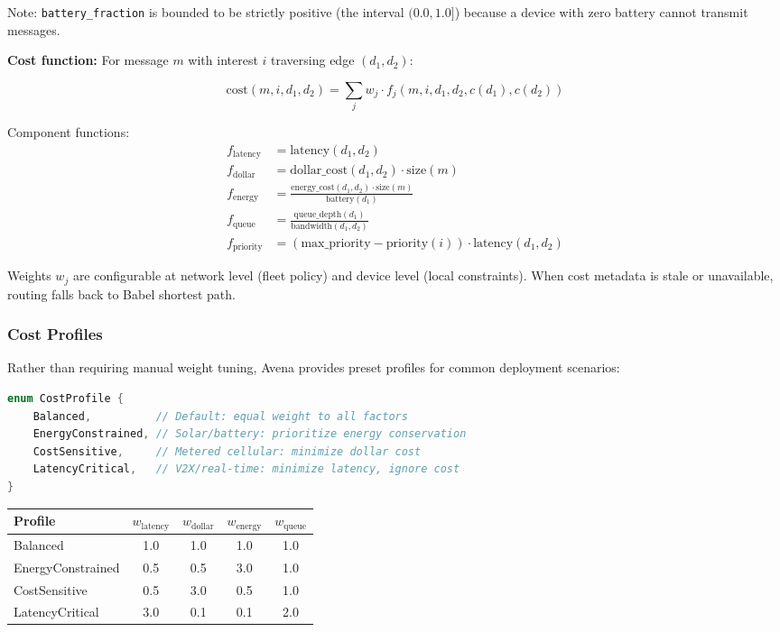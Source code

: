 Note: \texttt{battery\_fraction} is bounded to be strictly positive (the interval $(0.0, 1.0]$) because a device with zero battery cannot transmit messages.

\textbf{Cost function:} For message $m$ with interest $i$ traversing edge $(d_1, d_2)$:

\begin{equation}
\text{cost}(m, i, d_1, d_2) = \sum_j w_j \cdot f_j(m, i, d_1, d_2, c(d_1), c(d_2))
\end{equation}

Component functions:
\begin{align}
f_{\text{latency}} &= \text{latency}(d_1, d_2) \\
f_{\text{dollar}} &= \text{dollar\_cost}(d_1, d_2) \cdot \text{size}(m) \\
f_{\text{energy}} &= \frac{\text{energy\_cost}(d_1, d_2) \cdot \text{size}(m)}{\text{battery}(d_1)} \\
f_{\text{queue}} &= \frac{\text{queue\_depth}(d_1)}{\text{bandwidth}(d_1, d_2)} \\
f_{\text{priority}} &= (\text{max\_priority} - \text{priority}(i)) \cdot \text{latency}(d_1, d_2)
\end{align}

Weights $w_j$ are configurable at network level (fleet policy) and device level (local constraints). When cost metadata is stale or unavailable, routing falls back to Babel shortest path.

\subsubsection{Cost Profiles}

Rather than requiring manual weight tuning, Avena provides preset profiles for common deployment scenarios:

\begin{lstlisting}[language=Rust]
enum CostProfile {
    Balanced,          // Default: equal weight to all factors
    EnergyConstrained, // Solar/battery: prioritize energy conservation
    CostSensitive,     // Metered cellular: minimize dollar cost
    LatencyCritical,   // V2X/real-time: minimize latency, ignore cost
}
\end{lstlisting}

\begin{tabular}{@{}lcccc@{}}
\toprule
\textbf{Profile} & $w_{\text{latency}}$ & $w_{\text{dollar}}$ & $w_{\text{energy}}$ & $w_{\text{queue}}$ \\
\midrule
Balanced & 1.0 & 1.0 & 1.0 & 1.0 \\
EnergyConstrained & 0.5 & 0.5 & 3.0 & 1.0 \\
CostSensitive & 0.5 & 3.0 & 0.5 & 1.0 \\
LatencyCritical & 3.0 & 0.1 & 0.1 & 2.0 \\
\bottomrule
\end{tabular}

